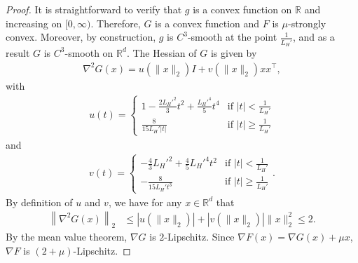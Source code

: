 \documentclass[10pt,a4paper]{amsart}
\newcommand{\RR}{\mathbb{R}}
\newcommand{\liph}{L_H}
\newcommand{\norm}[1] {\left \| #1 \right \|}
\begin{document}
\begin{proof}
	It is straightforward to verify that $g$ is a convex function on $\RR$ and increasing on $[0,\infty)$. Therefore, $G$ is a convex function and $ F$ is $\mu$-strongly convex. Moreover, by construction, $g$ is $C^3$-smooth at the point $\frac{1}{\liph'}$, and as a result $G$ is $C^3$-smooth on $\mathbb{R}^d$. The Hessian of \(G\) is given by
	\begin{align*}
		\nabla^2 G(x)= u(\|x\|_2) I + v(\|x\|_2) xx^\top,
	\end{align*}		
	with
	\begin{align*}
		u(t)= \begin{cases}
			1-\frac{2\liph'^2}{3} t^2 + \frac{\liph'^4}{5}t^4 &\text{if } |t|<\frac{1}{\liph'}\\
			\frac{8}{15\liph' |t|} & 	\text{if } |t|\ge\frac{1}{\liph'}
		\end{cases}
	\end{align*}
	and 
	\begin{align*}
		v(t)= \begin{cases}
			-\frac{4}{3} \liph'^2 + \frac{4}{5} \liph'^4 t^2 &\text{if } |t|<\frac{1}{\liph'}\\
			- \frac{8}{15 \liph' t^3}  & 	\text{if }|t|\ge\frac{1}{\liph'}
		\end{cases}.
	\end{align*}
	By definition of $u$ and $v$, we have for any $x \in \RR^d$ that
	\begin{align*}
		\norm{\nabla^2 G(x)}_2 &\le |u(\|x\|_2)| + |v(\|x\|_2)| \|x\|_2^2 \le 2.
	\end{align*}
	By the mean value theorem, $\nabla G$ is $2$-Lipschitz. Since $\nabla  F(x) = \nabla G(x) + \mu x$, $\nabla F$ is $(2+ \mu)$-Lipschitz.
	

\end{proof}
\end{document}
